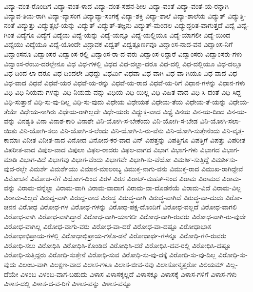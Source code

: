 {ವಿದ್ಯಾ-ವಂತ-ರೊಂದಿಗೆ
ವಿದ್ಯಾ-ವಂತ-ಳಾದ
ವಿದ್ಯಾ-ವಂತ-ಸಹನ-ಶೀಲ
ವಿದ್ಯಾ-ವಂತೆ
ವಿದ್ಯಾ-ವಂತೆ-ಯ-ರನ್ನಾಗಿ
ವಿದ್ಯಾವ-ತಿಯ-ರಾಗಿ
ವಿದ್ಯಾ-ವ್ಯಾಸಂಗ
ವಿದ್ಯಾವ್ಯಾ-ಸಂಗಕ್ಕೆ
ವಿದ್ಯಾ-ಶಕ್ತಿ
ವಿದ್ಯಾ-ಶಾಲೆ
ವಿದ್ಯಾ-ಶಾಲೆಯ
ವಿದ್ಯುತ್
ವಿದ್ಯುತ್ತಿ-ನಂತೆ
ವಿದ್ಯುತ್ತು
ವಿದ್ಯುತ್ಪ್ರಭೆ-ಯನ್ನು
ವಿದ್ಯುತ್
ವಿದ್ಯುತ್-ತಜ್ಞನು
ವಿದ್ಯುತ್-ಮಂಡಲ
ವಿದ್ಯುದ್ಭರಿತ-ವಾಗುತ್ತದೆ
ವಿದ್ಯೆ
ವಿದ್ಯೆ-ಗಿಂತ
ವಿದ್ಯೆಗೂ
ವಿದ್ಯೆಗೆ
ವಿದ್ಯೆಯ
ವಿದ್ಯೆ-ಯನ್ನು
ವಿದ್ಯೆ-ಯನ್ನೂ
ವಿದ್ಯೆ-ಯಲ್ಲಿಯೂ
ವಿದ್ಯೆ-ಯಾಗಲೀ
ವಿದ್ಯೆ-ಯಿಂದ
ವಿದ್ಯೆಯು
ವಿದ್ಯೆಯೂ
ವಿದ್ಯೆ-ಯೊಂದೇ
ವಿದ್ರಾವಕ
ವಿದ್ವತ್
ವಿದ್ವತ್ಪೂರ್ಣವೂ
ವಿದ್ವಾಂಸ-ನಾದ-ವನ
ವಿದ್ವಾಂಸ-ನಿಗೆ
ವಿದ್ವಾಂಸನೂ
ವಿದ್ವಾಂಸರ
ವಿದ್ವಾಂಸ-ರಲ್ಲಿ
ವಿದ್ವಾಂಸ-ರಾ-ದ-ವರು
ವಿದ್ವಾಂಸ-ರಿದ್ದಾರೆ
ವಿದ್ವಾಂಸರು
ವಿದ್ವಾಂಸರು-ಗಳು
ವಿದ್ವಾಂಸ-ರೆಂಬು-ದರಲ್ಲೇನೂ
ವಿಧ
ವಿಧ-ಗಳಲ್ಲಿ
ವಿಧದ
ವಿಧ-ದಲ್ಲಾ-ದರೂ
ವಿಧ-ದಲ್ಲಿ
ವಿಧ-ದಲ್ಲಿಯೂ
ವಿಧ-ದಲ್ಲೂ
ವಿಧ-ದಿಂದ-ಲಾ-ದರೂ
ವಿಧ-ದಿಂದಲೇ
ವಿಧದ್ದು
ವಿಧರ್ಮಿ
ವಿಧವಾ
ವಿಧ-ವಾಗಿ
ವಿಧ-ವಾ-ಗಿಯೂ
ವಿಧ-ವಾದ
ವಿಧ-ವಿಧ-ವಾದ
ವಿಧವೆ
ವಿಧವೆ-ಯರ
ವಿಧವೆ-ಯ-ರನ್ನು
ವಿಧವೆ-ಯ-ರಾದ
ವಿಧವೆ-ಯ-ರಿಗೆ
ವಿಧಾನ-ಗಳನ್ನು
ವಿಧಾನ-ಗಳು
ವಿಧಿ
ವಿಧಿ-ನಿಯಮ-ಗಳನ್ನು
ವಿಧಿ-ನಿಯಮ-ವನ್ನು
ವಿಧಿಯ
ವಿಧಿ-ಯಿಲ್ಲ
ವಿಧಿ-ವಿಹಿತ-ವಾದ
ವಿಧಿ-ಸಿ-ದಂತೆ
ವಿಧಿ-ಸಿದ್ದ
ವಿಧಿ-ಸುತ್ತಾನೆ
ವಿಧಿ-ಸು-ವು-ದಿಲ್ಲ
ವಿಧಿ-ಸು-ವುದು
ವಿಧೇಯ
ವಿಧೇಯತೆ
ವಿಧೇಯ-ತೆಯ
ವಿಧೇಯ-ತೆ-ಯನ್ನು
ವಿಧೇಯ-ತೆಯೇ
ವಿಧೇಯ-ನಾಗಿರು
ವಿಧೇಯ-ರಾಗಿಲ್ಲದೇ
ವಿಧೇ-ಯರು
ವಿಧ್ಯುಕ್ತ-ವಾದ
ವಿಧ್ಯೆ
ವಿನಯ
ವಿನ-ಯ-ದಿಂದ
ವಿನ-ಯ-ವನ್ನು
ವಿನಶ್ಯತಿ
ವಿನಾ
ವಿನಾಶ-ಕಾರಿ
ವಿನಾಶೇ
ವಿನಿ-ಯೋಗಿ-ಸ-ಬೇಕೆಂದು
ವಿನಿ-ಯೋಗಿ-ಸ-ಬೇಡ
ವಿನಿ-ಯೋಗಿ-ಸಲಾ-ಯಿತು
ವಿನಿ-ಯೋಗಿ-ಸಲು
ವಿನಿ-ಯೋಗಿ-ಸ-ಲೆಂದು
ವಿನಿ-ಯೋಗಿ-ಸಿ-ರು-ವೆನು
ವಿನಿ-ಯೋಗಿ-ಸುತ್ತೇನೆಂದು
ವಿನಿ-ವೃತ್ತ-ಕಾಮಾಃ
ವಿನೀತ
ವಿನೀತ-ನಾದ
ವಿನೋದ
ವಿನೋದ-ಕರ-ವಾದ
ವಿನ್
ವಿಪತ್ತನ್ನು
ವಿಪತ್ತಿಗೂ
ವಿಪತ್ತಿಗೆ
ವಿಪತ್ತು
ವಿಪರೀತ
ವಿಪರೀತ-ವಾದ
ವಿಪುಲ-ವಾದ
ವಿಪುಲಾ
ವಿಫಲ-ರಾದರು
ವಿಫಲ-ವಾಗದ
ವಿಭಾಗ
ವಿಭಾಗ-ಗಳು
ವಿಭಾಗದ
ವಿಭಾಗ-ಮಾಡಿ
ವಿಭಾಗ-ವಿದೆ
ವಿಭಾಗವು
ವಿಭಾಗ-ವೆಂದು
ವಿಭಾಗವೇ
ವಿಭಾಗಿ-ಸು-ವೆಯೋ
ವಿಮರ್ಶಿ-ಸುತ್ತಿದ್ದೆ
ವಿಮರ್ಶಿಸು-ವುದ-ರಲ್ಲೇ
ವಿಮರ್ಶೆ
ವಿಮರ್ಶೆಯು
ವಿಮಾನ-ಮಾಲಂಬ್ಯ
ವಿಮುಕ್ತ-ನಾಗು-ವನು
ವಿಮುಕ್ತ-ರಾದ
ವಿಮುಖ-ರಾಗಿದ್ದೇವೆ
ವಿಮೋಚನೆ
ವಿಮೋಚ-ನೆಗೆ
ವಿಯೋಗ-ದಿಂದ
ವಿರಳ
ವಿರಸ
ವಿರಾಟ್-ಮಹತ್-ನಿಂದ
ವಿರಾಮ
ವಿರಾಮದ
ವಿರಾಮ-ವನ್ನು
ವಿರಾಮ-ವನ್ನೆಲ್ಲಾ
ವಿರಾಮ-ವಾಗಿ
ವಿರಾಮ-ವಾದಾಗ
ವಿರಾಮ-ವಾ-ದೊಡನೆಯೆ
ವಿರಾಮ-ವಿದೆ
ವಿರಾಮ-ವಿಲ್ಲ
ವಿರಾಮ-ವಿಲ್ಲದೆ
ವಿರುದ್ದ-ವಾಗಿ
ವಿರುದ್ದ-ವಾದ
ವಿರುದ್ಧ
ವಿರುದ್ಧ-ವಾಗಿ
ವಿರುದ್ಧ-ವಾಗಿದೆ
ವಿರುದ್ಧ-ವಾ-ದುದು
ವಿರೋ-ಚನನ
ವಿರೋಧ
ವಿರೋಧ-ಗಳ
ವಿರೋಧ-ಗಳನ್ನು
ವಿರೋಧ-ಪಕ್ಷ-ದೊಂದಿಗೆ
ವಿರೋಧ-ವಲ್ಲದೆ
ವಿರೋಧ-ವಾಗಲಿ
ವಿರೋಧ-ವಾಗಿ
ವಿರೋಧ-ವಾಗಿದ್ದಾರೆ
ವಿರೋಧ-ವಾಗಿ-ಯಾಗಲೀ
ವಿರೋಧ-ವಾಗಿ-ರುವರು
ವಿರೋಧ-ವಾಗಿ-ರು-ವುದೇ
ವಿರೋಧ-ವಾಗಿಲ್ಲ
ವಿರೋಧ-ವಾಗು-ವರು
ವಿರೋಧ-ವಾ-ದರೆ
ವಿರೋಧ-ವಾ-ದಷ್ಟೂ
ವಿರೋಧಾಭಾಸ
ವಿರೋಧಾಭಿಪ್ರಾಯ-ಗಳಲ್ಲಿ
ವಿರೋಧಾಭಿಪ್ರಾಯ-ಗಳೊ-ಡನೆ
ವಿರೋಧಾರ್ಥ-ಗಳನ್ನೂ
ವಿರೋಧಿ-ಗಳಿ-ರುವರು
ವಿರೋಧಿ-ಸಲು
ವಿರೋಧಿಸಿ
ವಿರೋಧಿಸಿ-ಕೊಂಡಿದೆ
ವಿರೋಧಿಸಿ-ದರೆ
ವಿರೋಧಿಸಿ-ದವ-ರಲ್ಲಿ
ವಿರೋಧಿಸಿ-ದಷ್ಟೂ
ವಿರೋಧಿ-ಸುತ್ತಿದ್ದರು
ವಿರೋಧಿ-ಸುತ್ತೇನೆ
ವಿರೋಧಿ-ಸುವ
ವಿರೋಧಿ-ಸು-ವು-ದಕ್ಕೆ
ವಿರೋಧಿ-ಸು-ವು-ದಿಲ್ಲ
ವಿರೋಧಿ-ಸು-ವುದು
ವಿಲಂಬ-ವಾಗಿ
ವಿಲಕ್ಷಣ-ವಾದ
ವಿಲಾಸ-ಗಳೂ
ವಿಲಾಸ-ಜೀವ-ನವು
ವಿಲಾಸೋನ್ಮತ್ತರೋ
ವಿಲಿಯಮ್
ವಿಲ್ಲ-ದೆಯೇ
ವಿಳಂಬ
ವಿಳಂಬ-ವಾಗ-ಬಹುದು
ವಿಳಾಸ
ವಿಳಾಸಕ್ಕಲ್ಲದೆ
ವಿಳಾಸಕ್ಕೂ
ವಿಳಾಸಕ್ಕೆ
ವಿಳಾಸ-ಗಳಿಗೆ
ವಿಳಾಸ-ಗಳು
ವಿಳಾಸ-ದಲ್ಲಿ
ವಿಳಾಸ-ದ-ವ-ರಿಗೆ
ವಿಳಾಸ-ವನ್ನು
ವಿಳಾಸ-ವನ್ನೂ
}
